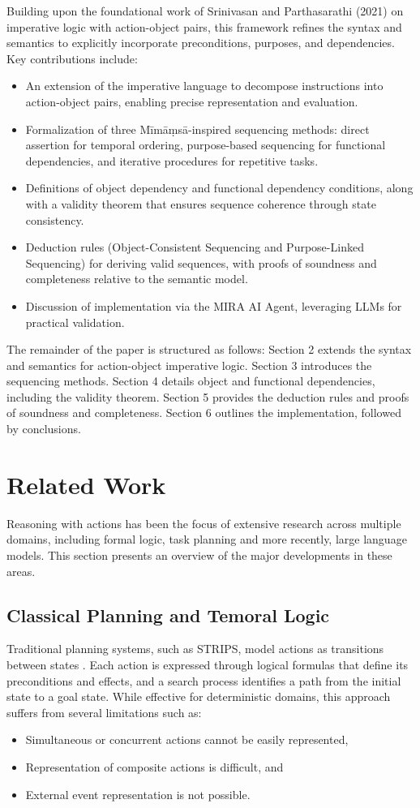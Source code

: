 \documentclass[a4paper,11pt]{lmcs}
\begin{document}
Building upon the foundational work of Srinivasan and Parthasarathi (2021) on imperative logic with action-object pairs, this framework refines the syntax and semantics to explicitly incorporate preconditions, purposes, and dependencies. Key contributions include:
\begin{itemize}
\item An extension of the imperative language to decompose instructions into action-object pairs, enabling precise representation and evaluation.
\item Formalization of three Mīmāṃsā-inspired sequencing methods: direct assertion for temporal ordering, purpose-based sequencing for functional dependencies, and iterative procedures for repetitive tasks.
\item Definitions of object dependency and functional dependency conditions, along with a validity theorem that ensures sequence coherence through state consistency.
\item Deduction rules (Object-Consistent Sequencing and Purpose-Linked Sequencing) for deriving valid sequences, with proofs of soundness and completeness relative to the semantic model.
\item Discussion of implementation via the MIRA AI Agent, leveraging LLMs for practical validation.
\end{itemize}
The remainder of the paper is structured as follows: Section 2 extends the syntax and semantics for action-object imperative logic. Section 3 introduces the sequencing methods. Section 4 details object and functional dependencies, including the validity theorem. Section 5 provides the deduction rules and proofs of soundness and completeness. Section 6 outlines the implementation, followed by conclusions.

\section{Related Work}
Reasoning with actions has been the focus of extensive research across multiple domains, including formal logic, task planning and more recently, large language models. This section presents an overview of the major developments in these areas.
\subsection{Classical Planning and Temoral Logic}
Traditional planning systems, such as STRIPS, model actions as transitions between states \citep{strips}. Each action is expressed through logical formulas that define its preconditions and effects, and a search process identifies a path from the initial state to a goal state. While effective for deterministic domains, this approach suffers from several limitations such as:
\begin{itemize}
\item Simultaneous or concurrent actions cannot be easily represented,
\item Representation of composite actions is difficult, and
\item External event representation is not possible.
\end{itemize}
\end{document}
